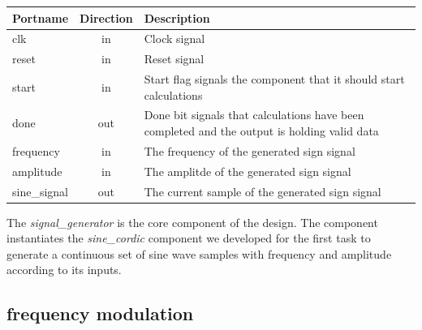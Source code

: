 \begin{adjustwidth}{-3.3cm}{}
	\begin{center}
		\begin{tabular}{ | l | c | l | }
			\hline
			\textbf{Portname} & \textbf{Direction} & \textbf{Description} \\
			\hline
			clk & in & Clock signal \\
			reset & in  & Reset signal \\
			start & in  & Start flag signals the component that it should start calculations \\
			done & out  & Done bit signals that calculations have been completed and the output is holding valid data \\
			frequency & in  & The frequency of the generated sign signal \\
			amplitude & in  & The amplitde of the generated sign signal \\
			sine\_signal & out  & The current sample of the generated sign signal \\
			\hline
		\end{tabular} 
	\end{center}
\end{adjustwidth}

\vspace{4mm}

The \textit{signal\_generator} is the core component of the design. The component instantiates the \textit{sine\_cordic} component we developed for the first task to generate a continuous set of sine wave samples with frequency and amplitude according to its inputs. 


\subsection{frequency modulation}


